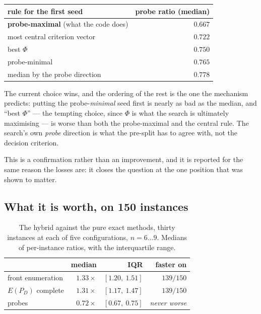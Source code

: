 \documentclass[11pt,a4paper]{article}
\newcommand{\Dset}{D}
\newcommand{\E}{E(P_{\Dset})}
\begin{document}
\begin{center}
\begin{tabular}{lr}
\toprule
rule for the first seed & probe ratio (median) \\
\midrule
\textbf{probe-maximal} (what the code does) & $\mathbf{0.667}$ \\
most central criterion vector & $0.722$ \\
best $\Phi$ & $0.750$ \\
probe-minimal & $0.765$ \\
median by the probe direction & $0.778$ \\
\bottomrule
\end{tabular}
\end{center}

\noindent
The current choice wins, and the ordering of the rest is the one the mechanism
predicts: putting the probe-\emph{minimal} seed first is nearly as bad as the
median, and ``best $\Phi$'' --- the tempting choice, since $\Phi$ is what the
search is ultimately maximising --- is worse than both the probe-maximal and
the central rule.  The search's own \emph{probe} direction is what the
pre-split has to agree with, not the decision criterion.

This is a confirmation rather than an improvement, and it is reported for the
same reason the losses are: it closes the question at the one position that was
shown to matter.

\subsection{What it is worth, on 150 instances}

\begin{table}[h]
\centering
\caption{The hybrid against the pure exact methods, thirty instances at each of
five configurations, $n = 6 \dots 9$.  Medians of per-instance ratios, with the
interquartile range.}
\label{tab:hybridfront}
\begin{tabular}{lrrr}
\toprule
 & median & IQR & faster on \\
\midrule
front enumeration & $1.33\times$ & $[1.20,\ 1.51]$ & $139/150$ \\
$\E$ complete     & $\mathbf{1.31\times}$ & $[1.17,\ 1.47]$ & $139/150$ \\
probes            & $0.72\times$ & $[0.67,\ 0.75]$ & \emph{never worse} \\
\bottomrule
\end{tabular}
\end{table}
\end{document}
